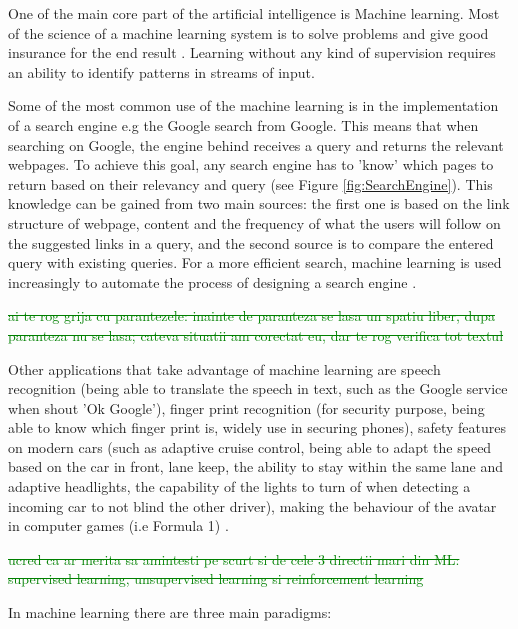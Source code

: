 One of the main core part of the artificial intelligence is Machine learning. Most of the science of a machine learning system is to solve problems and give good insurance for the end result \cite{MLIntro}. Learning without any kind of supervision requires an ability to identify patterns in streams of input. \par

Some of the most common use of the machine learning is in the implementation of a search engine e.g the Google search from Google. This means that when searching on Google, the engine behind receives a query and returns the relevant webpages. To achieve this goal, any search engine has to 'know' which pages to return based on their relevancy and query (see Figure \ref{fig:SearchEngine}). This knowledge can be gained from two main sources: the first one is based on the link structure of webpage, content and the frequency of what the users will follow on the suggested links in a query, and the second source is to compare the entered query with existing queries. For a more efficient search, machine learning is used increasingly to automate the process of designing a search engine \cite{MLIntro}. \par

\textcolor{green}{\sout{ai te rog grija cu parantezele: inainte de paranteza se lasa un spatiu liber, dupa paranteza nu se lasa; cateva situatii am corectat eu, dar te rog verifica tot textul}}

Other applications that take advantage of machine learning are speech recognition (being able to translate the speech in text, such as the Google service when shout 'Ok Google'), finger print recognition (for security purpose, being able to know which finger print is, widely use in securing phones), safety features on modern cars (such as adaptive cruise control, being able to adapt the speed based on the car in front,  lane keep, the ability to stay within the same lane and adaptive headlights, the capability of the lights to turn of when detecting a incoming car to not blind the other driver), making the behaviour of the avatar in computer games (i.e Formula 1) \cite{MLIntro}. \par

\textcolor{green}{\sout{ucred ca ar merita sa amintesti pe scurt si de cele 3 directii mari din ML: supervised learning, unsupervised learning si reinforcement learning}} \par
In machine learning there are three main paradigms:

